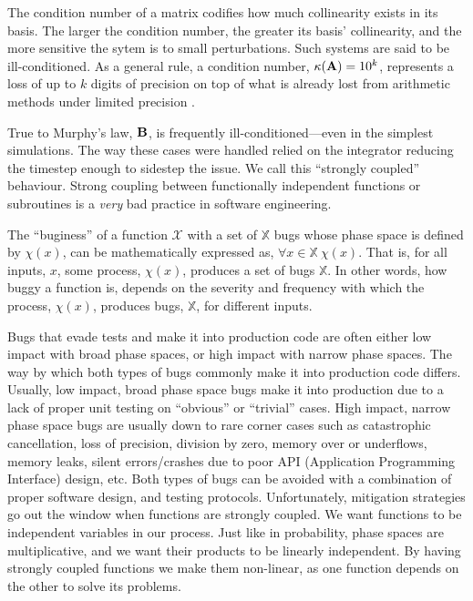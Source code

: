 The condition number of a matrix codifies how much collinearity exists in its basis. The larger the condition number, the greater its basis' collinearity, and the more sensitive the sytem is to small perturbations. Such systems are said to be ill-conditioned. As a general rule, a condition number, $\kappa(\mathbf{A}) = 10^k$, represents a loss of up to $k$ digits of precision on top of what is already lost from arithmetic methods under limited precision \cite{cheney2012numerical}.

True to Murphy's law, $\mathbf{B}$, is frequently ill-conditioned---even in the simplest simulations. The way these cases were handled relied on the integrator reducing the timestep enough to sidestep the issue. We call this ``strongly coupled'' behaviour. Strong coupling between functionally independent functions or subroutines is a \emph{very} bad practice in software engineering.

The ``buginess'' of a function $\mathcal{X}$ with a set of $\mathbb{X}$ bugs whose phase space is defined by $\chi(x)$, can be mathematically expressed as, $\forall x \in \mathbb{X}~ \chi(x)$. That is, for all inputs, $x$, some process, $\chi(x)$, produces a set of bugs $\mathbb{X}$. In other words, how buggy a function is, depends on the severity and frequency with which the process, $\chi(x)$, produces bugs, $\mathbb{X}$, for different inputs.

Bugs that evade tests and make it into production code are often either low impact with broad phase spaces, or high impact with narrow phase spaces. The way by which both types of bugs commonly make it into production code differs. Usually, low impact, broad phase space bugs make it into production due to a lack of proper unit testing on ``obvious'' or ``trivial'' cases. High impact, narrow phase space bugs are usually down to rare corner cases such as catastrophic cancellation, loss of precision, division by zero, memory over or underflows, memory leaks, silent errors/crashes due to poor API (Application Programming Interface) design, etc. Both types of bugs can be avoided with a combination of proper software design, and testing protocols. Unfortunately, mitigation strategies go out the window when functions are strongly coupled. We want functions to be independent variables in our process. Just like in probability, phase spaces are multiplicative, and we want their products to be linearly independent. By having strongly coupled functions we make them non-linear, as one function depends on the other to solve its problems.

